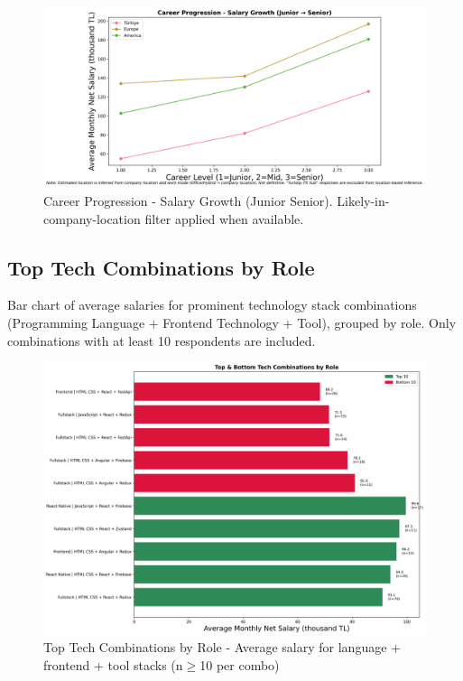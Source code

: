 \documentclass[12pt,a4paper]{article}
\begin{document}
\begin{figure}[H]
    \centering
    \includegraphics[width=\textwidth]{figures/line_career_progression_salary_growth.png}
    \caption{Career Progression - Salary Growth (Junior \textrightarrow{} Senior). Likely-in-company-location filter applied when available.}

\end{figure}

\subsection{Top Tech Combinations by Role}
Bar chart of average salaries for prominent technology stack combinations (Programming Language + Frontend Technology + Tool), grouped by role. Only combinations with at least 10 respondents are included.

\begin{figure}[H]
    \centering
    \includegraphics[width=\textwidth]{figures/barplot_tech_combinations_by_role.png}
    \caption{Top Tech Combinations by Role - Average salary for language + frontend + tool stacks (n\ensuremath{{\geq}}10 per combo)}
\end{figure}
\end{document}
